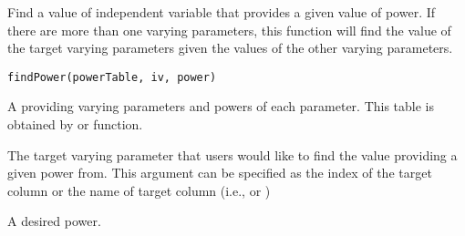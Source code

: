 \documentclass[a4paper]{book}
\begin{document}
%
\begin{Description}\relax
Find a value of independent variable that provides a given value of power. If there are more than one varying parameters, this function will find the value of the target varying parameters given the values of the other varying parameters.
\end{Description}
%
\begin{Usage}
\begin{verbatim}
findPower(powerTable, iv, power)
\end{verbatim}
\end{Usage}
%
\begin{Arguments}
\begin{ldescription}
\item[\code{powerTable}] 
A  providing varying parameters and powers of each parameter. This table is obtained by  or  function.

\item[\code{iv}] 
The target varying parameter that users would like to find the value providing a given power from. This argument can be specified as the index of the target column or the name of target column (i.e.,  or )

\item[\code{power}] 
A desired power.

\end{ldescription}
\end{Arguments}
%
\end{document}
